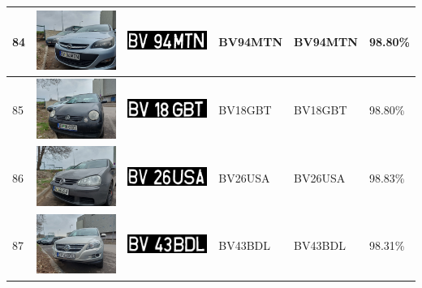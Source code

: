 \documentclass[a4paper,12pt]{report}
\begin{document}
\begin{longtable}{| m{0.6cm} | m{3cm} | m{3cm} | m{1.8cm} | m{1.8cm} | m{1.8cm} |}
    84  & \includegraphics[width=3cm,keepaspectratio]{dataset/49_d1.jpg}  & \includegraphics[width=3cm,keepaspectratio]{segmentari/84.jpg}  & BV94MTN             & BV94MTN              & 98.80\%    \\ \hline
    85  & \includegraphics[width=3cm,keepaspectratio]{dataset/50_d1.jpg}  & \includegraphics[width=3cm,keepaspectratio]{segmentari/85.jpg}  & BV18GBT             & BV18GBT              & 98.80\%    \\ \hline
    86  & \includegraphics[width=3cm,keepaspectratio]{dataset/51_d1.jpg}  & \includegraphics[width=3cm,keepaspectratio]{segmentari/86.jpg}  & BV26USA             & BV26USA              & 98.83\%    \\ \hline
    87  & \includegraphics[width=3cm,keepaspectratio]{dataset/52_d1.jpg}  & \includegraphics[width=3cm,keepaspectratio]{segmentari/87.jpg}  & BV43BDL             & BV43BDL              & 98.31\%    \\ \hline

\end{longtable}
\end{document}
